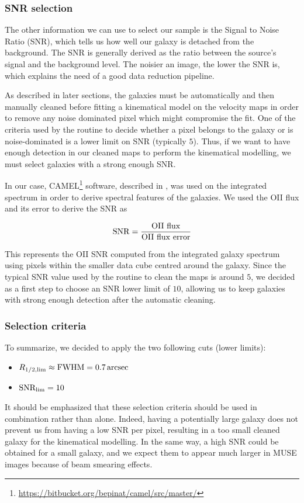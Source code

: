 \subsubsection{SNR selection}

The other information we can use to select our sample is the Signal to Noise Ratio (SNR), which tells us how well our galaxy is detached from the background. The SNR is generally derived as the ratio between the source's signal and the background level. The noisier an image, the lower the SNR is, which explains the need of a good data reduction pipeline.

As described in later sections, the galaxies must be automatically and then manually cleaned before fitting a kinematical model on the velocity maps in order to remove any noise dominated pixel which might compromise the fit. One of the criteria used by the routine to decide whether a pixel belongs to the galaxy or is noise-dominated is a lower limit on SNR (typically $5$). Thus, if we want to have enough detection in our cleaned maps to perform the kinematical modelling, we must select galaxies with a strong enough SNR.

In our case, \textsc{CAMEL}\footnote{\url{https://bitbucket.org/bepinat/camel/src/master/}} software, described in , was used on the integrated spectrum in order to derive spectral features of the galaxies. We used the OII flux and its error to derive the SNR as

\begin{equation}
	\rm{SNR} = \frac{\rm{OII \,\, flux}}{\rm{OII \,\, flux \,\, error}}
\end{equation}

This represents the OII SNR computed from the integrated galaxy spectrum using pixels within the smaller data cube centred around the galaxy. Since the typical SNR value used by the routine to clean the maps is around $5$, we decided as a first step to choose an SNR lower limit of $10$, allowing us to keep galaxies with strong enough detection after the automatic cleaning.

\subsubsection{Selection criteria}

To summarize, we decided to apply the two following cuts (lower limits):

\begin{itemize}
	\item $R_{1/2 , \rm{lim}} \approx \rm{FWHM} = \SI{0.7}{arcsec}$
	\item $\rm{SNR_{lim}} = 10$
\end{itemize}

It should be emphasized that these selection criteria should be used in combination rather than alone. Indeed, having a potentially large galaxy does not prevent us from having a low SNR per pixel, resulting in a too small cleaned galaxy for the kinematical modelling. In the same way, a high SNR could be obtained for a small galaxy, and we expect them to appear much larger in MUSE images because of beam smearing effects.





 
